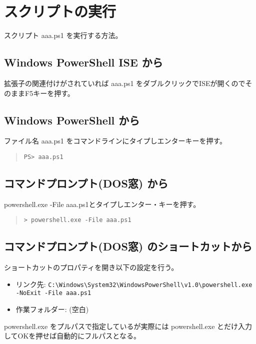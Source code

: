 \documentclass[dvipdfmx]{jsarticle}
\begin{document}
\section{スクリプトの実行}

スクリプト aaa.ps1 を実行する方法。

\subsection{Windows PowerShell ISE から}
拡張子の関連付けがされていれば aaa.ps1 をダブルクリックでISEが開くのでそのままF5キーを押す。

\subsection{Windows PowerShell から}
ファイル名 aaa.ps1 をコマンドラインにタイプしエンターキーを押す。

\begin{quote}
\begin{verbatim}
PS> aaa.ps1
\end{verbatim}
\end{quote}

\subsection{コマンドプロンプト(DOS窓) から}

powershell.exe -File aaa.ps1とタイプしエンター・キーを押す。

\begin{quote}
\begin{verbatim}
> powershell.exe -File aaa.ps1
\end{verbatim}
\end{quote}


\subsection{コマンドプロンプト(DOS窓) のショートカットから}
ショートカットのプロパティを開き以下の設定を行う。

\begin{itemize}
\item リンク先: \verb+C:\Windows\System32\WindowsPowerShell\v1.0\powershell.exe -NoExit -File aaa.ps1+
\item 作業フォルダー: (空白)
\end{itemize}

powershell.exe をプルパスで指定しているが実際には powershell.exe とだけ入力してOKを押せば自動的にフルパスとなる。
\end{document}
